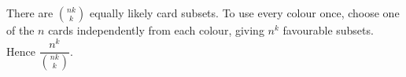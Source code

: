 There are $\binom{nk}{k}$ equally likely card subsets. To use every colour once, choose one of the $n$ cards independently from each colour, giving $n^k$ favourable subsets. Hence $\boxed{\dfrac{n^k}{\binom{nk}{k}}}$.
